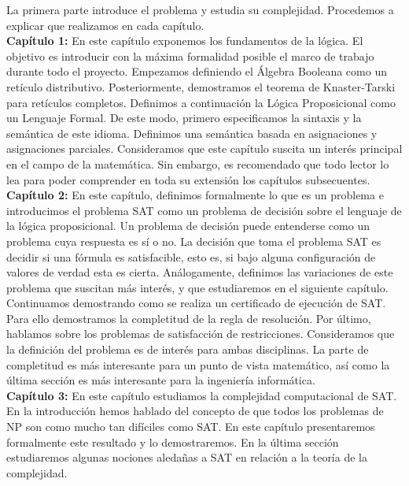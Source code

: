 La primera parte introduce el problema y estudia su complejidad. Procedemos a explicar que realizamos en cada capítulo.\\

\textbf{Capítulo 1:} En este capítulo exponemos los fundamentos de la lógica. El objetivo es introducir con la máxima formalidad posible el marco de trabajo durante todo el proyecto. 
Empezamos definiendo el Álgebra Booleana como un retículo distributivo. Posteriormente, demostramos el teorema de Knaster-Tarski para retículos completos. Definimos a continuación la Lógica Proposicional como un Lenguaje Formal. De este modo, primero especificamos la sintaxis y la semántica de este idioma. Definimos una semántica basada en asignaciones y asignaciones parciales. Consideramos que este capítulo suscita un interés principal en el campo de la matemática. Sin embargo, es recomendado que todo lector lo lea para poder comprender en toda su extensión los capítulos subsecuentes.\\

\textbf{Capítulo 2:} En este capítulo, definimos formalmente lo que es un problema e introducimos el problema SAT como un problema de decisión sobre el lenguaje de la lógica proposicional. Un  problema de decisión puede entenderse como un problema cuya respuesta es sí o no. La decisión que toma el problema SAT es decidir si una fórmula es satisfacible, esto es, si bajo alguna configuración de valores de verdad esta es cierta. Análogamente, definimos las variaciones de este problema que suscitan más interés, y que estudiaremos en el siguiente capítulo. Continuamos demostrando como se realiza un certificado de ejecución de SAT. Para ello demostramos la completitud de la regla de resolución. Por último, hablamos sobre los problemas de satisfacción de restricciones. Consideramos que la definición del problema es de interés para ambas disciplinas. La parte de completitud es más interesante para un punto de vista matemático, así como la última sección es más interesante para la ingeniería informática.\\

\textbf{Capítulo 3:} En este capítulo estudiamos la complejidad computacional de SAT. En la introducción hemos hablado del concepto de que todos los problemas de NP son como mucho tan difíciles como SAT. En este capítulo presentaremos formalmente este resultado y lo demostraremos. En la última sección estudiaremos algunas nociones aledañas a SAT en relación a la teoría de la complejidad.\\

